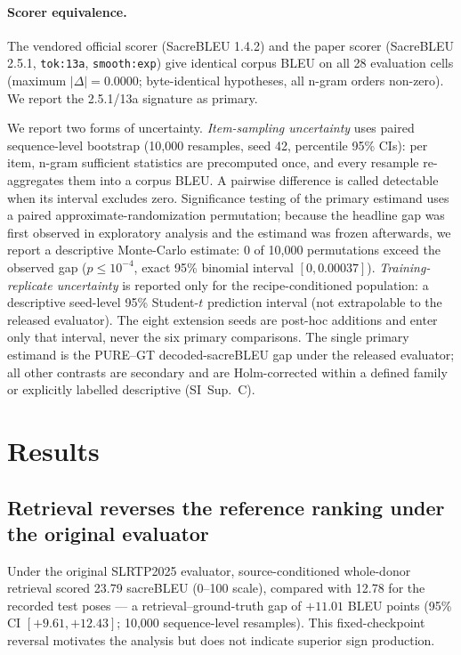 \documentclass[pdflatex,sn-chicago]{sn-jnl}
\begin{document}
\paragraph{Scorer equivalence.}
The vendored official scorer (SacreBLEU 1.4.2) and the paper scorer (SacreBLEU 2.5.1, \texttt{tok:13a}, \texttt{smooth:exp}) give identical corpus BLEU on all 28 evaluation cells (maximum $|\Delta|=0.0000$; byte-identical hypotheses, all n-gram orders non-zero). We report the 2.5.1/13a signature as primary.

We report two forms of uncertainty. \emph{Item-sampling uncertainty} uses paired sequence-level bootstrap (10{,}000 resamples, seed 42, percentile 95\% CIs): per item, n-gram sufficient statistics are precomputed once, and every resample re-aggregates them into a corpus BLEU. A pairwise difference is called detectable when its interval excludes zero. Significance testing of the primary estimand uses a paired approximate-randomization permutation; because the headline gap was first observed in exploratory analysis and the estimand was frozen afterwards, we report a descriptive Monte-Carlo estimate: 0 of 10{,}000 permutations exceed the observed gap ($p\leq10^{-4}$, exact 95\% binomial interval $[0,0.00037]$). \emph{Training-replicate uncertainty} is reported only for the recipe-conditioned population: a descriptive seed-level 95\% Student-$t$ prediction interval (not extrapolable to the released evaluator). The eight extension seeds are post-hoc additions and enter only that interval, never the six primary comparisons. The single primary estimand is the PURE--GT decoded-sacreBLEU gap under the released evaluator; all other contrasts are secondary and are Holm-corrected within a defined family or explicitly labelled descriptive (SI~Sup.~C).

\section{Results}
\subsection{Retrieval reverses the reference ranking under the original evaluator}
\label{sec:public-diagnostic}
Under the original SLRTP2025 evaluator, source-conditioned whole-donor retrieval scored 23.79 sacreBLEU (0--100 scale), compared with 12.78 for the recorded test poses --- a retrieval--ground-truth gap of $+11.01$ BLEU points (95\% CI $[+9.61,+12.43]$; 10,000 sequence-level resamples). This fixed-checkpoint reversal motivates the analysis but does not indicate superior sign production.
\end{document}
